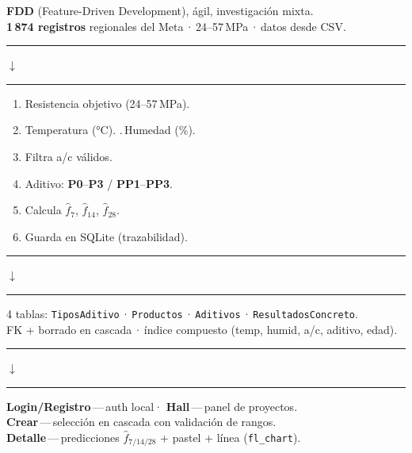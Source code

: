 \documentclass[10pt]{article}
\newcommand{\flowconn}[1]{%
  \vspace{0.5mm}%
  \begin{center}%
    \textcolor{#1}{\rule{2cm}{0.8pt}\enspace$\downarrow$\enspace\rule{2cm}{0.8pt}}%
  \end{center}%
  \vspace{0.5mm}%
}
\begin{document}
\begin{minipage}[t]{0.2425\textwidth}

  \begin{tcolorbox}[subbox, title=Metodología — Enfoque y Dataset]
    \small
    \textbf{FDD} (Feature-Driven Development), ágil, investigación mixta.\\
    \textbf{1\,874 registros} regionales del Meta\,·\,24–57\,MPa\,·\,datos desde CSV.
  \end{tcolorbox}

  \flowconn{pinkprimary}

  \begin{tcolorbox}[subbox, title=Metodología — Flujo de Decisión]
    \small
      \begin{enumerate}[leftmargin=14pt, topsep=0pt, itemsep=0pt]
      \item Resistencia objetivo (24–57\,MPa).
      \item Temperatura (°C). .\,Humedad (\%).
      \item[4.] Filtra a/c válidos.
      \item[5.] Aditivo: \textbf{P0}–\textbf{P3} / \textbf{PP1}–\textbf{PP3}.
      \item[6.] Calcula $\hat{f}_7$, $\hat{f}_{14}$, $\hat{f}_{28}$.
      \item[7.] Guarda en SQLite (trazabilidad).
    \end{enumerate}
  \end{tcolorbox}

  \flowconn{pinkprimary}

  \begin{tcolorbox}[subbox, title=Metodología — Base de Datos SQLite]
    \small
    4 tablas: \texttt{TiposAditivo}\,·\,\texttt{Productos}\,·\,\texttt{Aditivos}\,·\,\texttt{ResultadosConcreto}.\\
    FK + borrado en cascada\,·\,índice compuesto (temp, humid, a/c, aditivo, edad).
  \end{tcolorbox}

  \flowconn{pinkprimary}

  \begin{tcolorbox}[subbox, title=Metodología — Vistas de la App]
    \small
    \textbf{Login/Registro}\,—\,auth local\enspace·\enspace
    \textbf{Hall}\,—\,panel de proyectos.\\
    \textbf{Crear}\,—\,selección en cascada con validación de rangos.\\
    \textbf{Detalle}\,—\,predicciones $\hat{f}_{7/14/28}$ + pastel + línea (\texttt{fl\_chart}).
  \end{tcolorbox}

\end{minipage}
\end{document}

